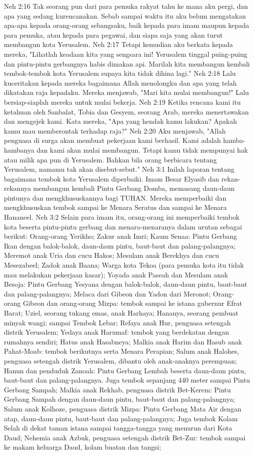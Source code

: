 Neh 2:16  Tak seorang pun dari para pemuka rakyat tahu ke mana aku pergi, dan apa yang sedang kurencanakan. Sebab sampai waktu itu aku belum mengatakan apa-apa kepada orang-orang sebangsaku, baik kepada para imam maupun kepada para pemuka, atau kepada para pegawai, dan siapa saja yang akan turut membangun kota Yerusalem.
Neh 2:17  Tetapi kemudian aku berkata kepada mereka, "Lihatlah keadaan kita yang sengsara ini! Yerusalem tinggal puing-puing dan pintu-pintu gerbangnya habis dimakan api. Marilah kita membangun kembali tembok-tembok kota Yerusalem supaya kita tidak dihina lagi."
Neh 2:18  Lalu kuceritakan kepada mereka bagaimana Allah menolongku dan apa yang telah dikatakan raja kepadaku. Mereka menjawab, "Mari kita mulai membangun!" Lalu bersiap-siaplah mereka untuk mulai bekerja.
Neh 2:19  Ketika rencana kami itu ketahuan oleh Sanbalat, Tobia dan Gesyem, seorang Arab, mereka menertawakan dan mengejek kami. Kata mereka, "Apa yang hendak kamu lakukan? Apakah kamu mau memberontak terhadap raja?"
Neh 2:20  Aku menjawab, "Allah penguasa di surga akan membuat pekerjaan kami berhasil. Kami adalah hamba-hambanya dan kami akan mulai membangun. Tetapi kamu tidak mempunyai hak atau milik apa pun di Yerusalem. Bahkan bila orang berbicara tentang Yerusalem, namamu tak akan disebut-sebut."
Neh 3:1  Inilah laporan tentang bagaimana tembok kota Yerusalem diperbaiki. Imam Besar Elyasib dan rekan-rekannya membangun kembali Pintu Gerbang Domba, memasang daun-daun pintunya dan mengkhususkannya bagi TUHAN. Mereka memperbaiki dan mengkhususkan tembok sampai ke Menara Seratus dan sampai ke Menara Hananeel.
Neh 3:2  Selain para imam itu, orang-orang ini memperbaiki tembok kota beserta pintu-pintu gerbang dan menara-menaranya dalam urutan sebagai berikut: Orang-orang Yerikho; Zakur anak Imri; Kaum Senaa: Pintu Gerbang Ikan dengan balok-balok, daun-daun pintu, baut-baut dan palang-palangnya; Meremot anak Uria dan cucu Hakos; Mesulam anak Berekhya dan cucu Mesezabeel; Zadok anak Baana; Warga kota Tekoa (para pemuka kota itu tidak mau melakukan pekerjaan kasar); Yoyada anak Paseah dan Mesulam anak Besoja: Pintu Gerbang Yesyana dengan balok-balok, daun-daun pintu, baut-baut dan palang-palangnya; Melaca dari Gibeon dan Yadon dari Meronot; Orang-orang Gibeon dan orang-orang Mizpa: tembok sampai ke istana gubernur Efrat Barat; Uziel, seorang tukang emas, anak Harhaya; Hananya, seorang pembuat minyak wangi; sampai Tembok Lebar; Refaya anak Hur, penguasa setengah distrik Yerusalem; Yedaya anak Harumaf: tembok yang berdekatan dengan rumahnya sendiri; Hatus anak Hasabneya; Malkia anak Harim dan Hasub anak Pahat-Moab: tembok berikutnya serta Menara Perapian; Salum anak Halohes, penguasa setengah distrik Yerusalem, dibantu oleh anak-anaknya perempuan; Hanun dan penduduk Zanoah: Pintu Gerbang Lembah beserta daun-daun pintu, baut-baut dan palang-palangnya. Juga tembok sepanjang 440 meter sampai Pintu Gerbang Sampah; Malkia anak Rekhab, penguasa distrik Bet-Kerem: Pintu Gerbang Sampah dengan daun-daun pintu, baut-baut dan palang-palangnya; Salum anak Kolhoze, penguasa distrik Mizpa: Pintu Gerbang Mata Air dengan atap, daun-daun pintu, baut-baut dan palang-palangnya; Juga tembok Kolam Selah di dekat taman istana sampai tangga-tangga yang menurun dari Kota Daud; Nehemia anak Azbuk, penguasa setengah distrik Bet-Zur: tembok sampai ke makam keluarga Daud, kolam buatan dan tangsi;
